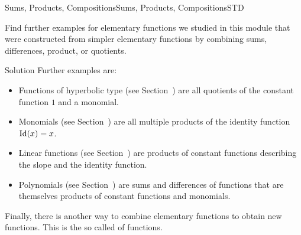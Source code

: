 \begin{MXContent}{Sums, Products, Compositions}{Sums, Products, Compositions}{STD}
\begin{MExample}
\begin{itemize}
%
\end{itemize}
 
\end{MExample}


\begin{MExercise}
Find further examples for elementary functions we studied in this module that were constructed from 
simpler elementary functions by combining sums, differences, product, or quotients. 

\begin{MHint}{Solution}
Further examples are:
\begin{itemize}
 \item Functions of hyperbolic type (see Section~) are all quotients 
  of the constant function $1$ and a monomial.
 \item Monomials (see Section~) are all multiple products of the 
  identity function $\operatorname{Id}(x)=x$.
 \item Linear functions (see Section~) are products of constant functions 
  describing the slope and the identity function.
 \item Polynomials (see Section~) are sums and differences of functions 
  that are themselves products of constant functions and monomials.
\end{itemize}
 
\end{MHint}

\end{MExercise}

Finally, there is another way to combine elementary functions to obtain new functions. This is the 
so called  of functions. 


\end{MXContent}
